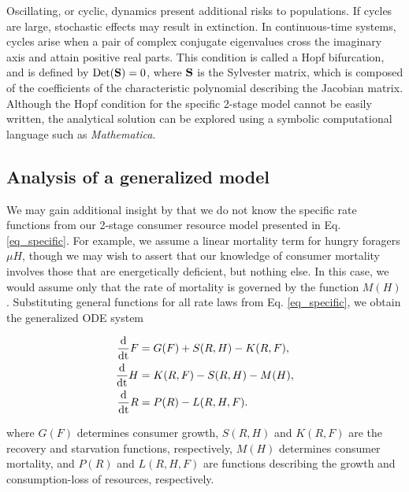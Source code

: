 \documentclass[12pt,english]{article}
\begin{document}
\begin{spacing}{1.9}
Oscillating, or cyclic, dynamics present additional risks to populations.
If cycles are large, stochastic effects may result in extinction.
In continuous-time systems, cycles arise when a pair of complex conjugate eigenvalues cross the imaginary axis and attain positive real parts.
This condition is called a Hopf bifurcation, and is defined by ${\rm Det}({\bf S}) = 0$, where $\bf S$ is the Sylvester matrix, which is composed of the coefficients of the characteristic polynomial describing the Jacobian matrix.
Although the Hopf condition for the specific 2-stage model cannot be easily written, the analytical solution can be explored using a symbolic computational language such as \emph{Mathematica}.


\subsection{Analysis of a generalized model}

We may gain additional insight by that we do not know the specific rate functions from our 2-stage consumer resource model presented in Eq. \ref{eq_specific}.
For example, we assume a linear mortality term for hungry foragers $\mu H$, though we may wish to assert that our knowledge of consumer mortality involves those that are energetically deficient, but nothing else.
In this case, we would assume only that the rate of mortality is governed by the function $M(H)$.
Substituting general functions for all rate laws from Eq. \ref{eq_specific}, we obtain the generalized ODE system

\begin{align}
\frac{\rm d}{\rm dt} F &= G(F) + S(R,H) - K(R,F), \nonumber \\
\frac{\rm d}{\rm dt} H &= K(R,F) - S(R,H) - M(H), \nonumber \\
\frac{\rm d}{\rm dt} R &= P(R) - L(R,H,F).
\label{eq_gen}
\end{align}

\noindent where $G(F)$ determines consumer growth, $S(R,H)$ and $K(R,F)$ are the recovery and starvation functions, respectively, $M(H)$ determines consumer mortality, and $P(R)$ and $L(R,H,F)$ are functions describing the growth and consumption-loss of resources, respectively.



\end{spacing}
\end{document}
